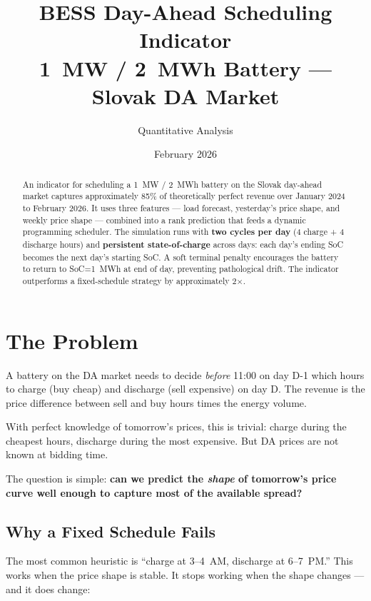 \documentclass[11pt,a4paper]{article}
\title{\textbf{BESS Day-Ahead Scheduling Indicator}\\[0.3em]
\large 1~MW / 2~MWh Battery --- Slovak DA Market}
\author{Quantitative Analysis}
\date{February 2026}
\begin{document}
\maketitle

\begin{abstract}
An indicator for scheduling a 1~MW / 2~MWh battery on the Slovak day-ahead market captures approximately 85\% of theoretically perfect revenue over January 2024 to February 2026. It uses three features --- load forecast, yesterday's price shape, and weekly price shape --- combined into a rank prediction that feeds a dynamic programming scheduler. The simulation runs with \textbf{two cycles per day} (4 charge + 4 discharge hours) and \textbf{persistent state-of-charge} across days: each day's ending SoC becomes the next day's starting SoC. A soft terminal penalty encourages the battery to return to SoC=1~MWh at end of day, preventing pathological drift. The indicator outperforms a fixed-schedule strategy by approximately 2$\times$.
\end{abstract}

\tableofcontents
\newpage

\section{The Problem}

A battery on the DA market needs to decide \emph{before} 11:00 on day D-1 which hours to charge (buy cheap) and discharge (sell expensive) on day D. The revenue is the price difference between sell and buy hours times the energy volume.

With perfect knowledge of tomorrow's prices, this is trivial: charge during the cheapest hours, discharge during the most expensive. But DA prices are not known at bidding time.

The question is simple: \textbf{can we predict the \emph{shape} of tomorrow's price curve well enough to capture most of the available spread?}

\subsection{Why a Fixed Schedule Fails}

The most common heuristic is ``charge at 3--4~AM, discharge at 6--7~PM.'' This works when the price shape is stable. It stops working when the shape changes --- and it does change:
\end{document}
